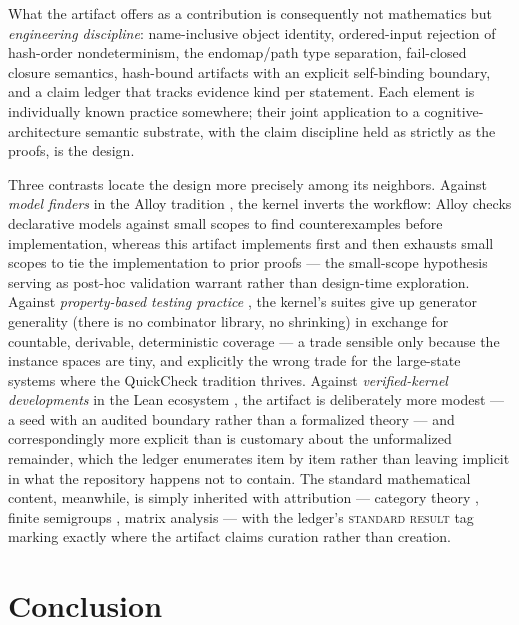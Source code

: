What the artifact offers as a contribution is consequently not
mathematics but \emph{engineering discipline}: name-inclusive object
identity, ordered-input rejection of hash-order nondeterminism, the
endomap/path type separation, fail-closed closure semantics,
hash-bound artifacts with an explicit self-binding boundary, and a
claim ledger that tracks evidence kind per statement. Each element is
individually known practice somewhere; their joint application to a
cognitive-architecture semantic substrate, with the claim discipline
held as strictly as the proofs, is the design.

Three contrasts locate the design more precisely among its neighbors.
Against \emph{model finders} in the Alloy tradition \cite{jackson},
the kernel inverts the workflow: Alloy checks declarative models
against small scopes to find counterexamples before implementation,
whereas this artifact implements first and then exhausts small scopes
to tie the implementation to prior proofs --- the small-scope
hypothesis serving as post-hoc validation warrant rather than
design-time exploration. Against \emph{property-based testing
practice} \cite{quickcheck}, the kernel's suites give up generator
generality (there is no combinator library, no shrinking) in exchange
for countable, derivable, deterministic coverage --- a trade sensible
only because the instance spaces are tiny, and explicitly the wrong
trade for the large-state systems where the QuickCheck tradition
thrives. Against \emph{verified-kernel developments} in the Lean
ecosystem \cite{lean4}, the artifact is deliberately more modest ---
a seed with an audited boundary rather than a formalized theory ---
and correspondingly more explicit than is customary about the
unformalized remainder, which the ledger enumerates item by item
rather than leaving implicit in what the repository happens not to
contain. The standard mathematical content, meanwhile, is simply
inherited with attribution --- category theory \cite{maclanecwm},
finite semigroups \cite{pin}, matrix analysis \cite{horn} --- with
the ledger's \textsc{standard result} tag marking exactly where the
artifact claims curation rather than creation.

\section{Conclusion}\label{ch12:sec:conclusion}

